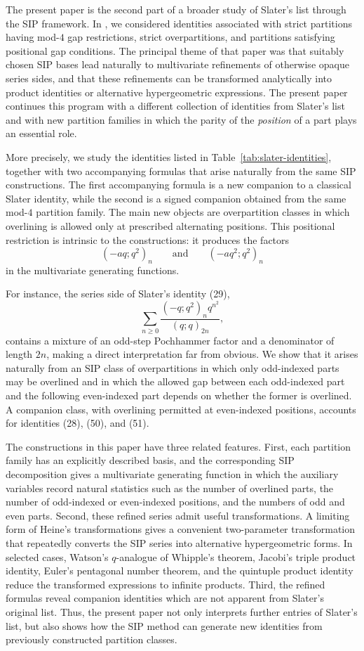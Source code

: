 \documentclass[11pt]{amsart}
\theoremstyle{definition}
\theoremstyle{remark}
\numberwithin{equation}{section}
\begin{document}
The present paper is the second part of a broader study of Slater's list through the SIP framework. In \cite{DGLSIPI}, we considered identities associated with strict partitions having mod-$4$ gap restrictions, strict overpartitions, and partitions satisfying positional gap conditions. The principal theme of that paper was that suitably chosen SIP bases lead naturally to multivariate refinements of otherwise opaque series sides, and that these refinements can be transformed analytically into product identities or alternative hypergeometric expressions. The present paper continues this program with a different collection of identities from Slater's list and with new partition families in which the parity of the \emph{position} of a part plays an essential role.

More precisely, we study the identities listed in Table~\ref{tab:slater-identities}, together with two accompanying formulas that arise naturally from the same SIP constructions. The first accompanying formula is a new companion to a classical Slater identity, while the second is a signed companion obtained from the same mod-$4$ partition family. The main new objects are overpartition classes in which overlining is allowed only at prescribed alternating positions. This positional restriction is intrinsic to the constructions: it produces the factors
\[
(-aq;q^2)_n
\qquad\text{and}\qquad
(-aq^2;q^2)_n
\]
in the multivariate generating functions.

For instance, the series side of Slater's identity (29),
\[
\sum_{n\geq0}\frac{(-q;q^2)_n q^{n^2}}{(q;q)_{2n}},
\]
contains a mixture of an odd-step Pochhammer factor and a denominator of length $2n$, making a direct interpretation far from obvious. We show that it arises naturally from an SIP class of overpartitions in which only odd-indexed parts may be overlined and in which the allowed gap between each odd-indexed part and the following even-indexed part depends on whether the former is overlined. A companion class, with overlining permitted at even-indexed positions, accounts for identities (28), (50), and (51).

The constructions in this paper have three related features. First, each partition family has an explicitly described basis, and the corresponding SIP decomposition gives a multivariate generating function in which the auxiliary variables record natural statistics such as the number of overlined parts, the number of odd-indexed or even-indexed positions, and the numbers of odd and even parts. Second, these refined series admit useful transformations. A limiting form of Heine's transformations gives a convenient two-parameter transformation that repeatedly converts the SIP series into alternative hypergeometric forms. In selected cases, Watson's $q$-analogue of Whipple's theorem, Jacobi's triple product identity, Euler's pentagonal number theorem, and the quintuple product identity reduce the transformed expressions to infinite products. Third, the refined formulas reveal companion identities which are not apparent from Slater's original list. Thus, the present paper not only interprets further entries of Slater's list, but also shows how the SIP method can generate new identities from previously constructed partition classes.
\end{document}
